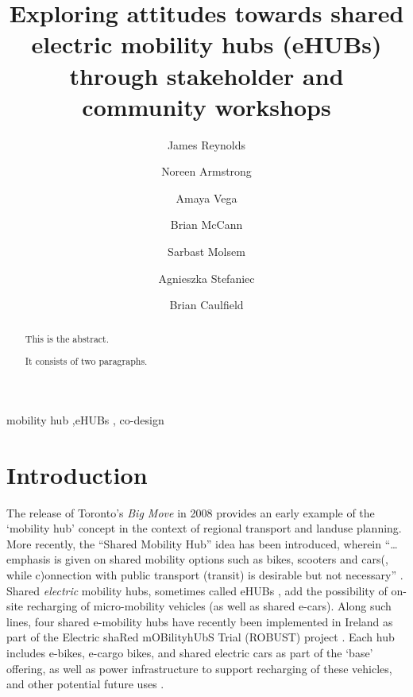 \documentclass[preprint, 3p,
authoryear]{elsarticle} %
\begin{document}
\begin{frontmatter}

  \title{Exploring attitudes towards shared electric mobility hubs
(eHUBs) through stakeholder and community workshops}
    \author[]{James Reynolds%
  }
    \author[]{Noreen Armstrong%
  }
    \author[]{Amaya Vega%
  }
    \author[]{Brian McCann%
  }
    \author[]{Sarbast Molsem%
  }
    \author[]{Agnieszka Stefaniec%
  }
    \author[]{Brian Caulfield%
  }
  
  \begin{abstract}
  This is the abstract.

  It consists of two paragraphs.
  \end{abstract}
    \begin{keyword}
    mobility hub \sep eHUBs \sep 
    co-design
  \end{keyword}
  
 \end{frontmatter}

\section{Introduction}\label{introduction}

The release of Toronto's \emph{Big Move} in 2008 \citep{Salsberg:2010aa}
provides an early example of the `mobility hub' concept in the context
of regional transport and landuse planning. More recently, the ``Shared
Mobility Hub'' idea has been introduced, wherein ``\ldots emphasis is
given on shared mobility options such as bikes, scooters and cars(,
while c)onnection with public transport (transit) is desirable but not
necessary'' \citep{Roukouni:2023aa}. Shared \emph{electric} mobility
hubs, sometimes called eHUBs \citep{Bosehans:2023aa}, add the
possibility of on-site recharging of micro-mobility vehicles (as well as
shared e-cars). Along such lines, four shared e-mobility hubs have
recently been implemented in Ireland as part of the Electric shaRed
mOBilityhUbS Trial (ROBUST) project \citep{ROBUST:2025aa}. Each hub
includes e-bikes, e-cargo bikes, and shared electric cars as part of the
`base' offering, as well as power infrastructure to support recharging
of these vehicles, and other potential future uses
\citep[\citet{Atlantic-Technological-University:2025aa},
\citet{Waterford-City-and-County-Council:2025aa}]{Atlantic-Technological-University:2025ab}.
\end{document}
